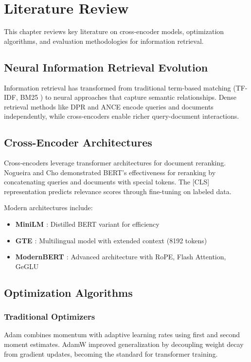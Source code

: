 \chapter{Literature Review}
\label{Chapter2}

This chapter reviews key literature on cross-encoder models, optimization algorithms, and evaluation methodologies for information retrieval.

\section{Neural Information Retrieval Evolution}

Information retrieval has transformed from traditional term-based matching (TF-IDF, BM25 \cite{robertson2009probabilistic}) to neural approaches that capture semantic relationships. Dense retrieval methods like DPR \cite{karpukhin2020dense} and ANCE \cite{xiong2020approximate} encode queries and documents independently, while cross-encoders enable richer query-document interactions.

\section{Cross-Encoder Architectures}

Cross-encoders leverage transformer architectures for document reranking. Nogueira and Cho \cite{nogueira2020passagererankingbert} demonstrated BERT's effectiveness for reranking by concatenating queries and documents with special tokens. The [CLS] representation predicts relevance scores through fine-tuning on labeled data.

Modern architectures include:
\begin{itemize}
\item \textbf{MiniLM \cite{wang2020minilm}}: Distilled BERT variant for efficiency
\item \textbf{GTE \cite{li2023towards}}: Multilingual model with extended context (8192 tokens)  
\item \textbf{ModernBERT \cite{modernbert}}: Advanced architecture with RoPE, Flash Attention, GeGLU
\end{itemize}

\section{Optimization Algorithms}

\subsection{Traditional Optimizers}
Adam \cite{kingma2017adam} combines momentum with adaptive learning rates using first and second moment estimates. AdamW \cite{loshchilov2019decoupled} improved generalization by decoupling weight decay from gradient updates, becoming the standard for transformer training.

